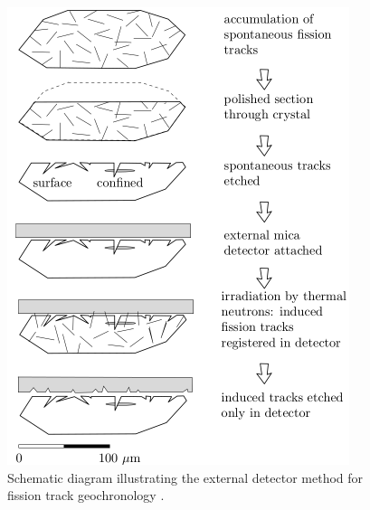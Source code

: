 \documentclass{book}
\newif\ifpdf
\begin{document}
\begin{figure}[!ht]
  \centering
  \ifpdf
  \def\svgwidth{.85\textwidth}
  
  \else
  \includegraphics[width=10cm]{EDM.png}
  \fi
  \caption{Schematic diagram illustrating the external detector method
    for fission track geochronology \citep[modified
      from][]{galbraith2005}.}
  \label{fig:EDM}
\end{figure}
\end{document}
